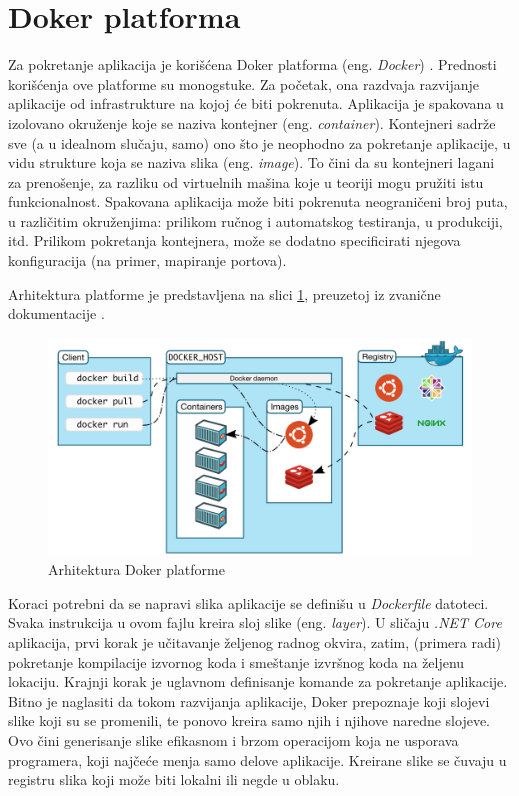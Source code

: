 \documentclass[12pt,oneside]{memoir}
\begin{document}
\section{Doker platforma}
Za pokretanje aplikacija je korišćena Doker platforma (eng. \emph{Docker}) \cite{Docker}. Prednosti korišćenja ove platforme su monogstuke. Za početak, ona razdvaja razvijanje aplikacije od infrastrukture na kojoj će biti pokrenuta. Aplikacija je spakovana u izolovano okruženje koje se naziva kontejner (eng. \emph{container}). Kontejneri sadrže sve (a u idealnom slučaju, samo) ono što je neophodno za pokretanje aplikacije, u vidu strukture koja se naziva slika (eng. \emph{image}). To čini da su kontejneri lagani za prenošenje, za razliku od virtuelnih mašina koje u teoriji mogu pružiti istu funkcionalnost. Spakovana aplikacija može biti pokrenuta neograničeni broj puta, u različitim okruženjima: prilikom ručnog i automatskog testiranja, u produkciji, itd. Prilikom pokretanja kontejnera, može se dodatno specificirati njegova konfiguracija (na primer, mapiranje portova).

Arhitektura platforme je predstavljena na slici \ref{fig:dockerarch}, preuzetoj iz zvanične dokumentacije \cite{DockerArch}. 

\begin{figure}[!ht]
  \centering
  \label{fig:dockerarch}
  \includegraphics[width=1.0\textwidth]{./images/docker_architecture.png}
  \caption{Arhitektura Doker platforme}
\end{figure}

Koraci potrebni da se napravi slika aplikacije se definišu u \emph{Dockerfile} datoteci. Svaka instrukcija u ovom fajlu kreira sloj slike (eng. \emph{layer}). U sličaju \emph{.NET Core} aplikacija, prvi korak je učitavanje željenog radnog okvira, zatim, (primera radi) pokretanje kompilacije izvornog koda i smeštanje izvršnog koda na željenu lokaciju. Krajnji korak je uglavnom definisanje komande za pokretanje aplikacije. Bitno je naglasiti da tokom razvijanja aplikacije, Doker prepoznaje koji slojevi slike koji su se promenili, te ponovo kreira samo njih i njihove naredne slojeve. Ovo čini generisanje slike efikasnom i brzom operacijom koja ne usporava programera, koji najčeće menja samo delove aplikacije. Kreirane slike se čuvaju u registru slika koji može biti lokalni ili negde u oblaku.
\end{document}

